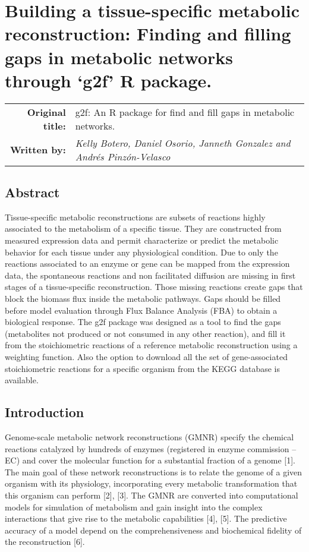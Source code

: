 \chapter{Building a tissue-specific metabolic reconstruction: Finding and filling gaps in metabolic networks through `g2f' R package.}
\begin{tabular}{rm{12cm}}
\textsf{\textbf{Original title:}}& g2f: An R package for find and fill gaps in metabolic networks.\\
\textsf{\textbf{Written by:}} & \textit{Kelly Botero, Daniel Osorio, Janneth Gonzalez and Andrés Pinzón-Velasco}\\ 
\end{tabular}
\section*{Abstract}
Tissue-specific metabolic reconstructions are subsets of reactions highly associated to the metabolism of a specific tissue. They are constructed from measured expression data and permit characterize or predict the metabolic behavior for each tissue under any physiological condition. Due to only the reactions associated to an enzyme or gene can be mapped from the expression data, the spontaneous reactions and non facilitated diffusion are missing in first stages of a tissue-specific reconstruction. Those missing reactions create gaps that block the biomass flux inside the metabolic pathways. Gaps should be filled before model evaluation through Flux Balance Analysis (FBA) to obtain a biological response. The g2f package was designed as a tool to find the gaps (metabolites not produced or not consumed in any other reaction), and fill it from the stoichiometric reactions of a reference metabolic reconstruction using a weighting function. Also the option to download all the set of gene-associated stoichiometric reactions for a specific organism from the KEGG database is available.
\section{Introduction}
Genome-scale metabolic network reconstructions (GMNR) specify the chemical reactions catalyzed by hundreds of enzymes (registered in enzyme commission – EC) and cover the molecular function for a substantial fraction of a genome [1]. The main goal of these network reconstructions is to relate the genome of a given organism with its physiology, incorporating every metabolic transformation that this organism can perform [2], [3]. The GMNR are converted into computational models for simulation of metabolism and gain insight into the complex interactions that give rise to the metabolic capabilities [4], [5]. The predictive accuracy of a model depend on the comprehensiveness and biochemical fidelity of the reconstruction [6].

